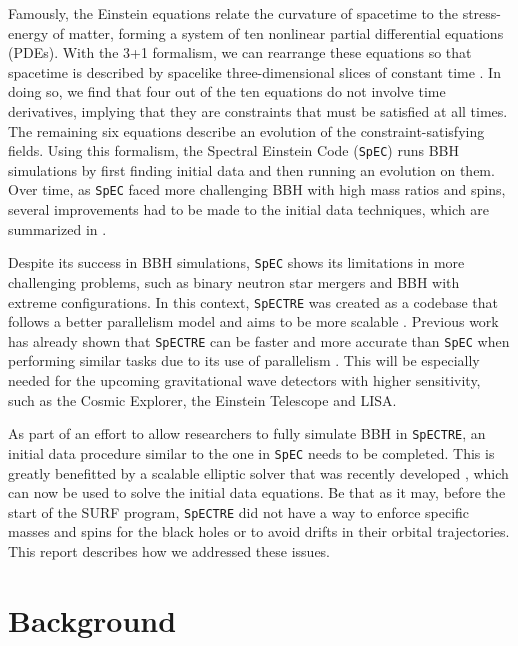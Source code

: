 \documentclass{../document}
\begin{document}
    Famously, the Einstein equations relate the curvature of spacetime to the stress-energy of matter, forming a system of ten nonlinear partial differential equations (PDEs). With the 3+1 formalism, we can rearrange these equations so that spacetime is described by spacelike three-dimensional slices of constant time \cite{Alcubierre}. In doing so, we find that four out of the ten equations do not involve time derivatives, implying that they are constraints that must be satisfied at all times. The remaining six equations describe an evolution of the constraint-satisfying fields. Using this formalism, the Spectral Einstein Code ({\tt SpEC}) \cite{SpEC} runs BBH simulations by first finding initial data and then running an evolution on them. Over time, as {\tt SpEC} faced more challenging BBH with high mass ratios and spins, several improvements had to be made to the initial data techniques, which are summarized in \cite{Serguei}.
    
    Despite its success in BBH simulations, {\tt SpEC} shows its limitations in more challenging problems, such as binary neutron star mergers and BBH with extreme configurations. In this context, {\tt SpECTRE} \cite{SpECTRE} was created as a codebase that follows a better parallelism model and aims to be more scalable \cite{Kidder}. Previous work has already shown that {\tt SpECTRE} can be faster and more accurate than {\tt SpEC} when performing similar tasks due to its use of parallelism \cite{Vu}. This will be especially needed for the upcoming gravitational wave detectors with higher sensitivity, such as the Cosmic Explorer, the Einstein Telescope and LISA.
    
    As part of an effort to allow researchers to fully simulate BBH in {\tt SpECTRE}, an initial data procedure similar to the one in {\tt SpEC} needs to be completed. This is greatly benefitted by a scalable elliptic solver that was recently developed \cite{Vu}, which can now be used to solve the initial data equations. Be that as it may, before the start of the SURF program, {\tt SpECTRE} did not have a way to enforce specific masses and spins for the black holes or to avoid drifts in their orbital trajectories. This report describes how we addressed these issues.


  \section{Background}
\end{document}
